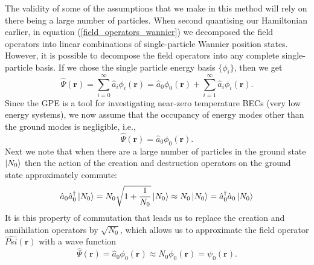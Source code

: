 \documentclass[a4paper, 10pt]{article}
\theoremstyle{plain}
\begin{document}
The validity of some of the assumptions that we make in this
method will rely on there being a large number of particles. When second
quantising our Hamiltonian earlier, in equation (\ref{field_operators_wannier})
we decomposed the field operators into linear combinations of single-particle
Wannier position states. However, it is possible to decompose the field
operators into any complete single-particle basis. If we chose the single
particle energy basis $\{\phi_i\}$, then we get
\begin{equation}
    \hat{\Psi}(\mathbf{r})
    =
    \sum_{i=0}^{\infty}{\hat{a}_i\phi_{i}(\mathbf{r})}
    =
    \hat{a}_{0} \phi_{0}(\mathbf{r}) +
    \sum_{i=1}^{\infty}{\hat{a}_i\phi_{i}(\mathbf{r})}.
\end{equation}
Since the GPE is a tool for investigating near-zero temperature BECs (very low
energy systems), we now assume that the occupancy of energy modes other than
the ground modes is negligible, i.e.,
\begin{equation}
 \hat{\Psi}(\mathbf{r})=\hat{a}_0\phi_{0}(\mathbf{r}).
\end{equation}
Next we note that when there are a large number of particles in the ground
state $\ket{N_0}$ then the action of the creation and destruction operators
on the ground state approximately commute:
\begin{equation}
 \hat{a}_0\hat{a}^\dagger_0\ket{N_0}
 =
 N_0 \sqrt{1+\frac{1}{N_0}}\ket{N_0}
 \approx
 N_0\ket{N_0}
 =
 \hat{a}^\dagger_0\hat{a}_0\ket{N_0}
\end{equation}
It is this property of commutation that leads us to replace the creation and
annihilation operators by $\sqrt{N_0}$, which allows us to approximate the
field operator $\hat{Psi}(\mathbf{r})$ with a wave function
\begin{equation}
    \hat{\Psi}(\mathbf{r})
    =
    \hat{a}_{0} \phi_{0}(\mathbf{r}) \approx N_{0} \phi_{0}(\mathbf{r})
    =
    \psi_{0}(\mathbf{r}).
\end{equation}
\end{document}
